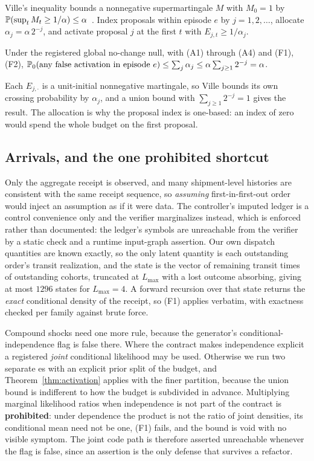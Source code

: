 Ville's inequality bounds a nonnegative supermartingale $M$ with $M_0 = 1$ by
$\mathbb{P}(\sup_t M_t \ge 1/\alpha) \le \alpha$~\cite{ville}. Index proposals within
episode $e$ by $j = 1, 2, \dots$, allocate $\alpha_j = \alpha\, 2^{-j}$, and
activate proposal $j$ at the first $t$ with $E_{j,t} \ge 1/\alpha_j$.

\begin{theorem}
\label{thm:activation}
Under the registered global no-change null, with (A1) through (A4) and (F1),
(F2),
$\mathbb{P}_0(\text{any false activation in episode } e)
\le \sum_j \alpha_j \le \alpha \sum_{j \ge 1} 2^{-j} = \alpha$.
\end{theorem}

Each $E_{j,\cdot}$ is a unit-initial nonnegative martingale, so Ville bounds its
own crossing probability by $\alpha_j$, and a union bound with
$\sum_{j\ge1} 2^{-j} = 1$ gives the result. The allocation is why the proposal
index is one-based: an index of zero would spend the whole budget on the first
proposal.

\subsection{Arrivals, and the one prohibited shortcut}

Only the aggregate receipt is observed, and many shipment-level histories are
consistent with the same receipt sequence, so \emph{assuming} first-in-first-out
order would inject an assumption as if it were data. The controller's imputed
ledger is a control convenience only and the verifier marginalizes instead, which
is enforced rather than documented: the ledger's symbols are unreachable from the
verifier by a static check and a runtime input-graph assertion. Our own dispatch
quantities are known exactly, so the only latent quantity is each outstanding
order's transit realization, and the state is the vector of remaining transit
times of outstanding cohorts, truncated at $L_{\max}$ with a lost outcome
absorbing, giving at most $1296$ states for $L_{\max} = 4$. A forward recursion
over that state returns the \emph{exact} conditional density of the receipt, so
(F1) applies verbatim, with exactness checked per family against brute force.

Compound shocks need one more rule, because the generator's
conditional-independence flag is false there. Where the contract makes
independence explicit a registered \emph{joint} conditional likelihood may be
used. Otherwise we run two separate \eprocess{}es with an explicit prior split of
the budget, and Theorem~\ref{thm:activation} applies with the finer partition,
because the union bound is indifferent to how the budget is subdivided in
advance. Multiplying marginal likelihood ratios when independence is not part of
the contract is \textbf{prohibited}: under dependence the product is not the
ratio of joint densities, its conditional mean need not be one, (F1) fails, and
the bound is void with no visible symptom. The joint code path is therefore
asserted unreachable whenever the flag is false, since an assertion is the only
defense that survives a refactor.

